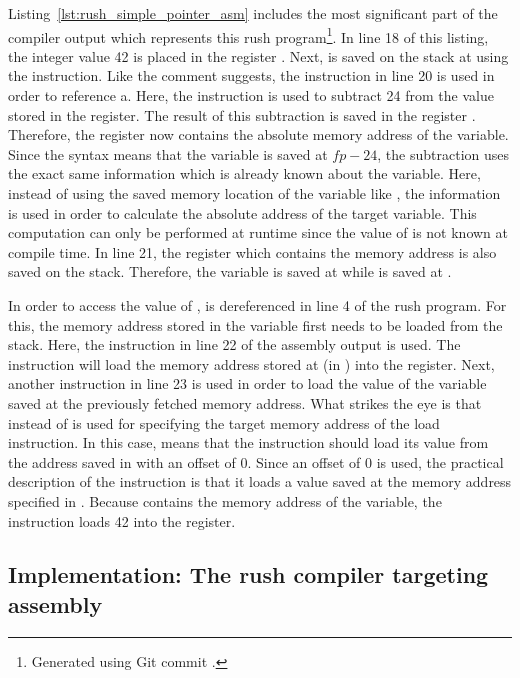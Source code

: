 Listing~\ref{lst:rush_simple_pointer_asm} includes the most significant part of the compiler output which represents this rush program\footnote{Generated using Git commit \rushCommit{}.}.
In line 18 of this listing, the integer value 42 is placed in the register .
Next,  is saved on the stack at  using the  instruction.
Like the comment suggests, the instruction in line 20 is used in order to reference a.
Here, the  instruction is used to subtract 24 from the value stored in the  register.
The result of this subtraction is saved in the register .
Therefore, the register now contains the absolute memory address of the  variable.
Since the syntax  means that the variable is saved at $fp - 24$, the subtraction uses the exact same information which is already known about the variable.
Here, instead of using the saved memory location of the variable like , the information is used in order to calculate the absolute address of the target variable.
This computation can only be performed at runtime since the value of  is not known at compile time.
In line 21, the  register which contains the memory address is also saved on the stack.
Therefore, the  variable is saved at  while  is saved at .

In order to access the value of ,  is dereferenced in line 4 of the rush program.
For this, the memory address stored in the variable  first needs to be loaded from the stack.
Here, the  instruction in line 22 of the assembly output is used.
The instruction will load the memory address stored at  (in ) into the  register.
Next, another  instruction in line 23 is used in order to load the value of the variable saved at the previously fetched memory address.
What strikes the eye is that  instead of  is used for specifying the target memory address of the load instruction.
In this case,  means that the instruction should load its value from the address saved in  with an offset of 0.
Since an offset of 0 is used, the practical description of the instruction is that it loads a value saved at the memory address specified in .
Because  contains the memory address of the  variable, the instruction loads 42 into the  register.

\subsection{Implementation: The rush compiler targeting \riscv{} assembly}


